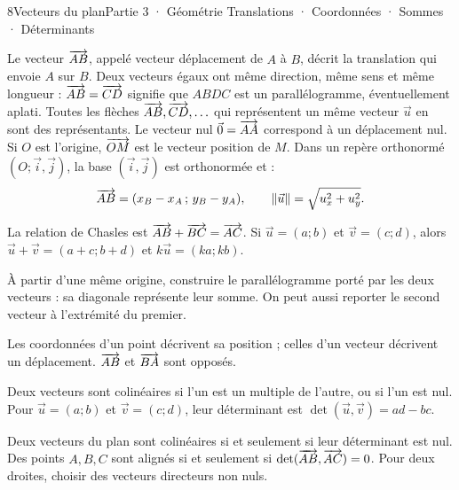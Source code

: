 \begin{ouverture}[vecteursplan]{8}{Vecteurs du plan}{Partie 3 · Géométrie}
{Translations · Coordonnées · Sommes · Déterminants}
\end{ouverture}
\pagestyle{otMain}\essentiel\fontsize{11}{15}\selectfont
{}
\begin{definition}Le vecteur $\overrightarrow{AB}$, appelé vecteur déplacement de $A$ à $B$, décrit la translation qui envoie $A$ sur $B$. Deux vecteurs égaux ont même direction, même sens et même longueur : $\overrightarrow{AB}=\overrightarrow{CD}$ signifie que $ABDC$ est un parallélogramme, éventuellement aplati. Toutes les flèches $\overrightarrow{AB},\overrightarrow{CD},\ldots$ qui représentent un même vecteur $\vec u$ en sont des représentants. Le vecteur nul $\vec0=\overrightarrow{AA}$ correspond à un déplacement nul. Si $O$ est l’origine, $\overrightarrow{OM}$ est le vecteur position de $M$. Dans un repère orthonormé $(O;\vec i,\vec j)$, la base $(\vec i,\vec j)$ est orthonormée et :
\[\overrightarrow{AB}=(x_B-x_A\,;\,y_B-y_A),\qquad\|\vec u\|=\sqrt{u_x^2+u_y^2}.\]
\end{definition}
\begin{propriete}La relation de Chasles est $\overrightarrow{AB}+\overrightarrow{BC}=\overrightarrow{AC}$. Si $\vec u=(a;b)$ et $\vec v=(c;d)$, alors $\vec u+\vec v=(a+c;b+d)$ et $k\vec u=(ka;kb)$.\end{propriete}
\begin{savoirfaire}À partir d’une même origine, construire le parallélogramme porté par les deux vecteurs : sa diagonale représente leur somme. On peut aussi reporter le second vecteur à l’extrémité du premier.\end{savoirfaire}
\begin{attention}Les coordonnées d’un point décrivent sa position ; celles d’un vecteur décrivent un déplacement. $\overrightarrow{AB}$ et $\overrightarrow{BA}$ sont opposés.\end{attention}
\clearpage
{}
\begin{definition}Deux vecteurs sont colinéaires si l’un est un multiple de l’autre, ou si l’un est nul. Pour $\vec u=(a;b)$ et $\vec v=(c;d)$, leur déterminant est $\det(\vec u,\vec v)=ad-bc$.\end{definition}
\begin{theoreme}Deux vecteurs du plan sont colinéaires si et seulement si leur déterminant est nul. Des points $A,B,C$ sont alignés si et seulement si $\det(\overrightarrow{AB},\overrightarrow{AC})=0$. Pour deux droites, choisir des vecteurs directeurs non nuls.\end{theoreme}
